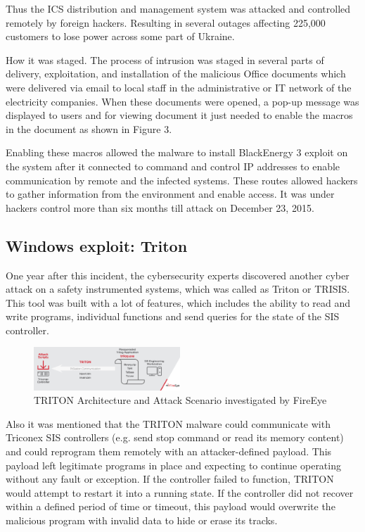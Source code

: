 \documentclass[conference]{IEEEtran}
\begin{document}
Thus the ICS distribution and management system was attacked and controlled remotely by foreign hackers. Resulting in several outages affecting 225,000 customers to lose power across some part of Ukraine. 



 How it was staged. The process of intrusion was staged in several parts of delivery, exploitation, and installation of the malicious Office documents which were delivered via email to local staff in the administrative or IT network of the electricity companies. When these documents
were opened, a pop-up message was displayed to users and for viewing document it just needed to enable the macros in the document as shown in Figure 3.

Enabling these macros allowed the malware to install BlackEnergy 3 exploit on the system after it connected to command and control IP addresses to enable communication by remote and the infected systems. These routes allowed hackers to gather information from the environment and enable access. It was under hackers control more than six months till attack on December 23, 2015.

\subsection{Windows exploit: Triton}
One year after this incident, the cybersecurity experts discovered another cyber attack on a safety instrumented systems, which was called as Triton or TRISIS. 
This tool was built with a lot of features, which includes the ability to read and write programs, individual functions and send queries for the state of the SIS controller. 
\begin{figure}[!htb]
	\includegraphics[width=0.49\textwidth]{images/Triton.png}
	\caption{ TRITON Architecture and Attack Scenario investigated by FireEye }
	\label{fig:TCPIP}
\end{figure}
Also it was mentioned that the TRITON malware could  communicate with Triconex SIS controllers (e.g. send  stop command or read its memory content) and could reprogram them remotely with an attacker-defined payload.  This payload left legitimate programs in place and expecting to continue operating without any fault or exception. If the controller failed to function, TRITON would attempt to restart it into a running state. If the controller did not recover within a defined period of time or timeout, this payload would overwrite the malicious program with invalid data to hide or erase its tracks.
\end{document}
